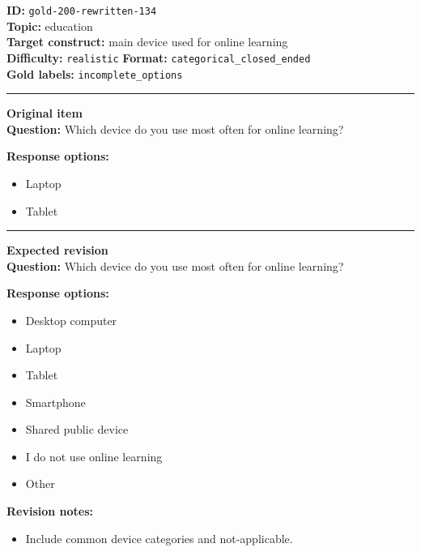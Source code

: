 \documentclass[10pt,a4paper]{article}
\newcommand{\sectionline}{\vspace{0.15em}\hrule\vspace{0.35em}}
\begin{document}
\begin{tcolorbox}[colframe=FlawRed,colback=white,colbacktitle=FlawRed!9,coltitle=black,title={Item 134\hfill Flawed item}]
\textbf{ID:} \texttt{gold-200-rewritten-134}\\
\textbf{Topic:} education\\
\textbf{Target construct:} main device used for online learning\\
\textbf{Difficulty:} \texttt{realistic} \quad \textbf{Format:} \texttt{categorical\_closed\_ended}\\
\textbf{Gold labels:} \texttt{incomplete\_options}\\
\sectionline
\textbf{Original item}\\
\textbf{Question:} Which device do you use most often for online learning?
\par\textbf{Response options:}
\begin{itemize}
\item Laptop
\item Tablet
\end{itemize}
\sectionline
\textbf{Expected revision}\\
\textbf{Question:} Which device do you use most often for online learning?
\par\textbf{Response options:}
\begin{itemize}
\item Desktop computer
\item Laptop
\item Tablet
\item Smartphone
\item Shared public device
\item I do not use online learning
\item Other
\end{itemize}
\par\textbf{Revision notes:}
\begin{itemize}
\item Include common device categories and not-applicable.
\end{itemize}
\end{tcolorbox}
\end{document}
